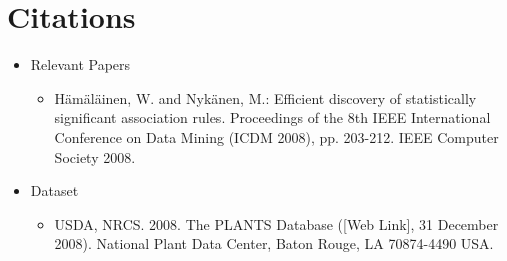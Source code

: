 \documentclass{Group6_Phase2}
\begin{document}
\section{Citations}
\begin{itemize}
	\item Relevant Papers
	\begin{itemize}	
		\item Hämäläinen, W. and Nykänen, M.: Efficient discovery of statistically significant association rules. Proceedings of the 8th IEEE International Conference on Data Mining (ICDM 2008), pp. 203-212. IEEE Computer Society 2008. 			
	\end{itemize}		
	\item Dataset
		\begin{itemize}		
			\item USDA, NRCS. 2008. The PLANTS Database ([Web Link], 31 December 2008). National Plant Data Center, Baton Rouge, LA 70874-4490 USA.
		\end{itemize}	
\end{itemize}
\end{document}
